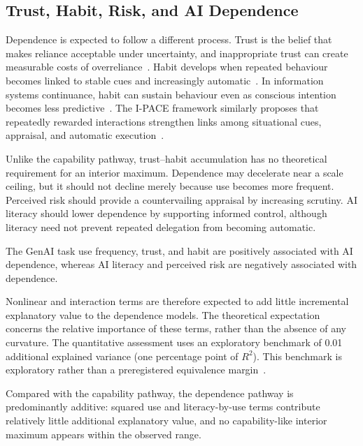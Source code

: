 \documentclass[sustainability,article,accept,moreauthors]{Definitions/mdpi}
\begin{document}
\subsection{Trust, Habit, Risk, and AI Dependence}

Dependence is expected to follow a different process. Trust is the belief that makes reliance acceptable under uncertainty, and inappropriate trust can create measurable costs of overreliance~\cite{lee2004,klingbeil2024}. Habit develops when repeated behaviour becomes linked to stable cues and increasingly automatic~\cite{woodneal2007}. In information systems continuance, habit can sustain behaviour even as conscious intention becomes less predictive~\cite{limayem2007}. The I-PACE framework similarly proposes that repeatedly rewarded interactions strengthen links among situational cues, appraisal, and automatic execution~\cite{brand2016}.

Unlike the capability pathway, trust--habit accumulation has no theoretical requirement for an interior maximum. Dependence may decelerate near a scale ceiling, but it should not decline merely because use becomes more frequent. Perceived risk should provide a countervailing appraisal by increasing scrutiny. AI literacy should lower dependence by supporting informed control, although literacy need not prevent repeated delegation from becoming automatic.

\begin{Hypothesis}
The GenAI task use frequency, trust, and habit are positively associated with AI dependence, whereas AI literacy and perceived risk are negatively associated with dependence.
\end{Hypothesis}

Nonlinear and interaction terms are therefore expected to add little incremental explanatory value to the dependence models. The theoretical expectation concerns the relative importance of these terms, rather than the absence of any curvature. The quantitative assessment uses an exploratory benchmark of  0.01 additional explained variance (one percentage point of $R^2$). This benchmark is exploratory rather than a preregistered equivalence margin~\cite{lakens2017}.

\begin{Hypothesis}
Compared with the capability pathway, the dependence pathway is predominantly additive: squared use and literacy-by-use terms contribute relatively little additional explanatory value, and no capability-like interior maximum appears within the observed range.
\end{Hypothesis}
\end{document}
